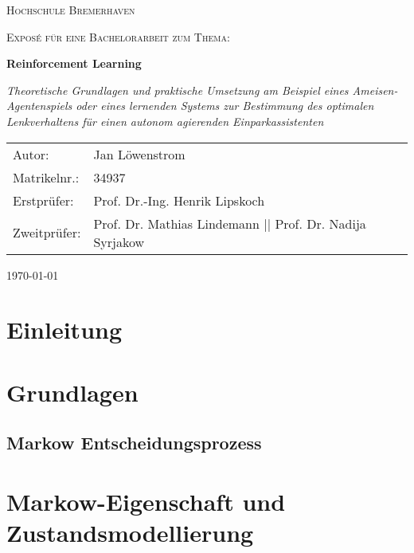 \documentclass[12pt]{article}
\begin{document}
\begin{titlepage}
	\centering	
	{\scshape\LARGE Hochschule Bremerhaven \par}
	\vspace{1cm}
	{\scshape\Large Exposé für eine Bachelorarbeit zum Thema:\par}
	\vspace{1.5cm}
	{\huge\bfseries Reinforcement Learning\par}
	\vspace{2cm}
	{\Large\itshape Theoretische Grundlagen und praktische Umsetzung am Beispiel
	eines Ameisen-Agentenspiels oder eines lernenden Systems zur Bestimmung des optimalen
	Lenkverhaltens für einen autonom agierenden Einparkassistenten
	\par}
	\vfill
	\begin{tabularx}{\textwidth}{lX}
		Autor: & Jan Löwenstrom \\
		Matrikelnr.: & 34937 \\
		Erstprüfer: & Prof. Dr.-Ing. Henrik Lipskoch \\
		Zweitprüfer: & Prof. Dr. Mathias Lindemann || Prof. Dr. Nadija Syrjakow \\
	\end{tabularx}  
    \vfill

	{\large \today \par}       
\end{titlepage}

\tableofcontents
\pagebreak
\listoffigures
\newpage


\noindent
\section{Einleitung}


\pagebreak

\section{Grundlagen}
	
	\subsection{Markow Entscheidungsprozess}
	
	\pagebreak
	
\section{Markow-Eigenschaft und Zustandsmodellierung}

\pagebreak


\pagebreak
\end{document}
